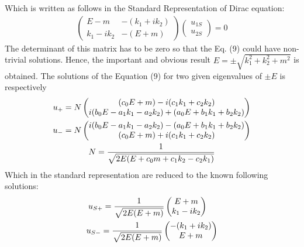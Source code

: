 \documentclass[twocolumn,aps,prb,showpacs]{revtex4-1}
\begin{document}
Which is written as follows in the Standard Representation of Dirac equation:
\begin{align}
	\begin{pmatrix}
		E-m & -(k_{1}+ik_{2}) \\
		k_{1}-ik_{2} & -(E+m)
	\end{pmatrix}
	\begin{pmatrix}
		u_{1S}\\
		u_{2S}
	\end{pmatrix}=0 
\end{align}
The determinant of this matrix has to be zero so that the Eq. (9) could have non-trivial solutions. Hence, the important and obvious result $E=\pm\sqrt{k_{1}^{2}+k_{2}^{2}+m^{2}}$ is obtained. 
The solutions of the Equation (9) for two given eigenvalues of $\pm E$ is respectively 
\begin{align}
	u_{+}=N
	\begin{pmatrix}
		(c_{0}E+m)-i(c_{1}k_{1}+c_{2}k_{2})	
		\\
		i(b_{0}E-a_{1}k_{1}-a_{2}k_{2})+(a_{0}E+b_{1}k_{1}+b_{2}k_{2})
	\end{pmatrix}\notag \\
	u_{-}=N
	\begin{pmatrix}
		i(b_{0}E-a_{1}k_{1}-a_{2}k_{2})-(a_{0}E+b_{1}k_{1}+b_{2}k_{2})	
		\\
		(c_{0}E+m)+i(c_{1}k_{1}+c_{2}k_{2})
	\end{pmatrix}\notag \\	
	N=\dfrac{1}{\sqrt{2E(E+c_{0}m+c_{1}k_{2}-c_{2}k_{1})}} \ \ \ \ \ \ \ \ \ \ \ \ \ 		
\end{align}
Which in the standard representation are reduced to the known following solutions:
\begin{align}
	u_{S+}=\dfrac{1}{\sqrt{2E(E+m)}}
	\begin{pmatrix}
		E+m	
		\\
		k_{1}-ik_{2}
	\end{pmatrix}\notag \ \ \ \ \\
	u_{S-}=\dfrac{1}{\sqrt{2E(E+m)}}
	\begin{pmatrix}
		-(k_{1}+ik_{2})
		\\
		E+m
	\end{pmatrix}	
\end{align} 
\end{document}
